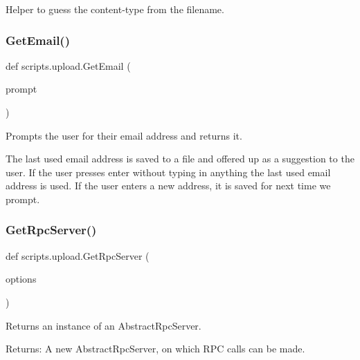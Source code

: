 \begin{DoxyVerb}Helper to guess the content-type from the filename.\end{DoxyVerb}
 \mbox{\label{namespacescripts_1_1upload_a6f78509aada94882d886ad10dd22c076}} 
\subsubsection{\texorpdfstring{GetEmail()}{GetEmail()}}
{\footnotesize\ttfamily def scripts.\+upload.\+Get\+Email (\begin{DoxyParamCaption}\item[{}]{prompt }\end{DoxyParamCaption})}

\begin{DoxyVerb}Prompts the user for their email address and returns it.

The last used email address is saved to a file and offered up as a suggestion
to the user. If the user presses enter without typing in anything the last
used email address is used. If the user enters a new address, it is saved
for next time we prompt.\end{DoxyVerb}
 \mbox{\label{namespacescripts_1_1upload_a488d8bbdefcfcf3b76eed1e4ecc9734d}} 
\subsubsection{\texorpdfstring{GetRpcServer()}{GetRpcServer()}}
{\footnotesize\ttfamily def scripts.\+upload.\+Get\+Rpc\+Server (\begin{DoxyParamCaption}\item[{}]{options }\end{DoxyParamCaption})}

\begin{DoxyVerb}Returns an instance of an AbstractRpcServer.

Returns:
  A new AbstractRpcServer, on which RPC calls can be made.
\end{DoxyVerb}
 \mbox{\label{namespacescripts_1_1upload_a6534b557ff9297b393beb2ad8c8df888}} 
